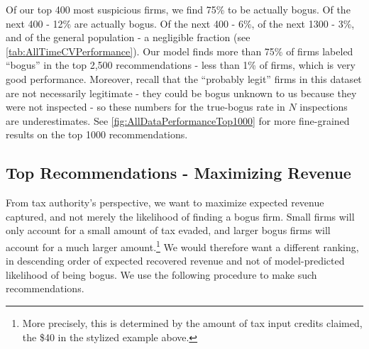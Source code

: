 Of our top 400 most suspicious firms, we find 75\% to be actually bogus. Of the next 400 - 12\% are actually bogus. Of the next 400 - 6\%, of the next 1300 - 3\%, and of the general population - a negligible fraction (see \cref{tab:AllTimeCVPerformance}). Our model finds more than 75\% of firms labeled ``bogus'' in the top 2,500 recommendations - less than 1\% of firms, which is very good performance. Moreover, recall that the ``probably legit'' firms in this dataset are not necessarily legitimate - they could be bogus unknown to us because they were not inspected - so these numbers for the true-bogus rate in $N$ inspections are underestimates. See \cref{fig:AllDataPerformanceTop1000} for more fine-grained results on the top 1000 recommendations.

 
\subsection{Top Recommendations - Maximizing Revenue}
\label{subsec:top-recommendations-revenue}
From tax authority's perspective, we want to maximize expected revenue captured, and not merely the likelihood of finding a bogus firm. Small firms will only account for a small amount of tax evaded, and larger bogus firms will account for a much larger amount.\footnote{More precisely, this is determined by the amount of tax input credits claimed, the \$40 in the stylized example above.} We would therefore want a different ranking, in descending order of expected recovered revenue and not of model-predicted likelihood of being bogus. We use the following procedure to make such recommendations.

